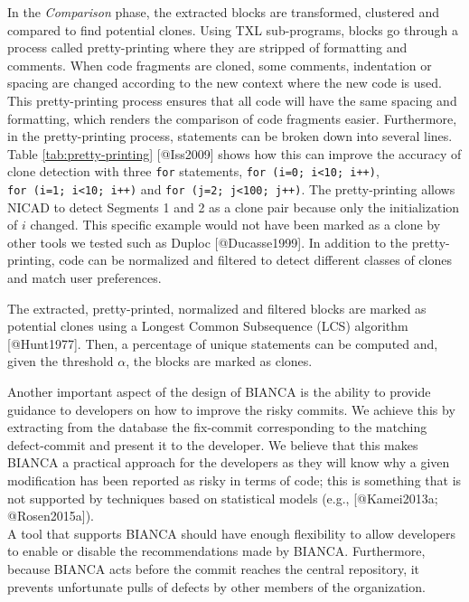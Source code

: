In the \emph{Comparison} phase, the extracted blocks are transformed,
clustered and compared to find potential clones. Using TXL sub-programs,
blocks go through a process called pretty-printing where they are
stripped of formatting and comments. When code fragments are cloned,
some comments, indentation or spacing are changed according to the new
context where the new code is used. This pretty-printing process ensures
that all code will have the same spacing and formatting, which renders
the comparison of code fragments easier. Furthermore, in the
pretty-printing process, statements can be broken down into several
lines. Table \ref{tab:pretty-printing} {[}@Iss2009{]} shows how this can
improve the accuracy of clone detection with three \texttt{for}
statements, \texttt{for\ (i=0;\ i\textless{}10;\ i++)},
\texttt{for\ (i=1;\ i\textless{}10;\ i++)} and
\texttt{for\ (j=2;\ j\textless{}100;\ j++)}. The pretty-printing allows
NICAD to detect Segments 1 and 2 as a clone pair because only the
initialization of \(i\) changed. This specific example would not have
been marked as a clone by other tools we tested such as Duploc
{[}@Ducasse1999{]}. In addition to the pretty-printing, code can be
normalized and filtered to detect different classes of clones and match
user preferences.



The extracted, pretty-printed, normalized and filtered blocks are marked
as potential clones using a Longest Common Subsequence (LCS) algorithm
{[}@Hunt1977{]}. Then, a percentage of unique statements can be computed
and, given the threshold \(\alpha\), the blocks are marked as clones.

Another important aspect of the design of BIANCA is the ability to
provide guidance to developers on how to improve the risky commits. We
achieve this by extracting from the database the fix-commit
corresponding to the matching defect-commit and present it to the
developer. We believe that this makes BIANCA a practical approach for
the developers as they will know why a given modification has been
reported as risky in terms of code; this is something that is not
supported by techniques based on statistical models (e.g.,
{[}@Kamei2013a; @Rosen2015a{]}).\\
A tool that supports BIANCA should have enough flexibility to allow
developers to enable or disable the recommendations made by BIANCA.
Furthermore, because BIANCA acts before the commit reaches the central
repository, it prevents unfortunate pulls of defects by other members of
the organization.

